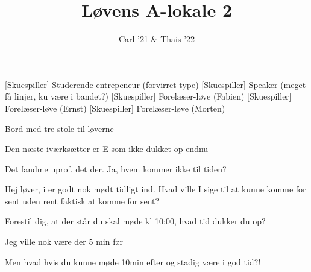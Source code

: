 \documentclass[a4paper,11pt]{article}
\title{Løvens A-lokale 2}
\author{Carl '21 \& Thais '22}
\begin{document}
\maketitle

\begin{roles}
[Skuespiller] Studerende-entrepeneur (forvirret type)
[Skuespiller] Speaker (meget få linjer, ku være i bandet?)
[Skuespiller] Forelæser-løve (Fabien)
[Skuespiller] Forelæser-løve (Ernst)
[Skuespiller] Forelæser-løve (Morten)
\end{roles}

\begin{props}
\item Bord med tre stole til løverne
\end{props}


\begin{sketch}
 Den næste iværksætter er E som ikke dukket op endnu

 Det fandme uprof. det der. 
 Ja, hvem kommer ikke til tiden?

 Hej løver, i er godt nok mødt tidligt ind. Hvad ville I sige til at kunne komme for sent uden rent faktisk at komme for sent?


 Forestil dig, at der står du skal møde kl  10:00, hvad tid dukker du op? 

 Jeg ville nok være der 5 min før

 Men hvad hvis du kunne møde 10min efter og stadig være i god tid?!

\end{sketch}
\end{document}
